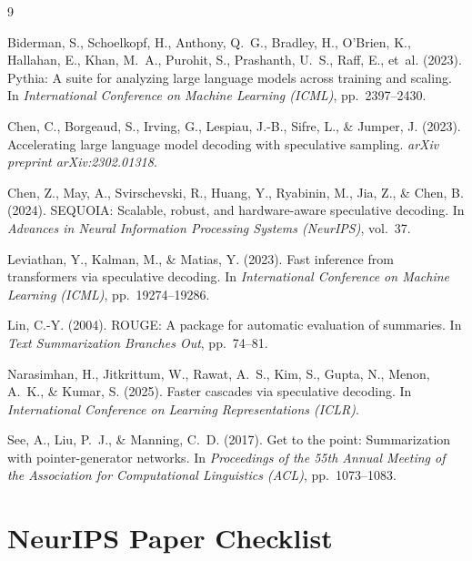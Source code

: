 \documentclass[10pt]{article}
\begin{document}
\medskip
{
\small
\begin{thebibliography}{9}

Biderman, S., Schoelkopf, H., Anthony, Q.~G., Bradley, H., O'Brien, K., Hallahan, E., Khan, M.~A., Purohit, S., Prashanth, U.~S., Raff, E., et~al. (2023).
\newblock Pythia: A suite for analyzing large language models across training and scaling.
\newblock In \emph{International Conference on Machine Learning (ICML)}, pp.\ 2397--2430.

Chen, C., Borgeaud, S., Irving, G., Lespiau, J.-B., Sifre, L., \& Jumper, J. (2023).
\newblock Accelerating large language model decoding with speculative sampling.
\newblock \emph{arXiv preprint arXiv:2302.01318}.

Chen, Z., May, A., Svirschevski, R., Huang, Y., Ryabinin, M., Jia, Z., \& Chen, B. (2024).
\newblock SEQUOIA: Scalable, robust, and hardware-aware speculative decoding.
\newblock In \emph{Advances in Neural Information Processing Systems (NeurIPS)}, vol.\ 37.

Leviathan, Y., Kalman, M., \& Matias, Y. (2023).
\newblock Fast inference from transformers via speculative decoding.
\newblock In \emph{International Conference on Machine Learning (ICML)}, pp.\ 19274--19286.

Lin, C.-Y. (2004).
\newblock ROUGE: A package for automatic evaluation of summaries.
\newblock In \emph{Text Summarization Branches Out}, pp.\ 74--81.

Narasimhan, H., Jitkrittum, W., Rawat, A.~S., Kim, S., Gupta, N., Menon, A.~K., \& Kumar, S. (2025).
\newblock Faster cascades via speculative decoding.
\newblock In \emph{International Conference on Learning Representations (ICLR)}.

See, A., Liu, P.~J., \& Manning, C.~D. (2017).
\newblock Get to the point: Summarization with pointer-generator networks.
\newblock In \emph{Proceedings of the 55th Annual Meeting of the Association for Computational Linguistics (ACL)}, pp.\ 1073--1083.

\end{thebibliography}
}

\newpage
\section*{NeurIPS Paper Checklist}
\end{document}

